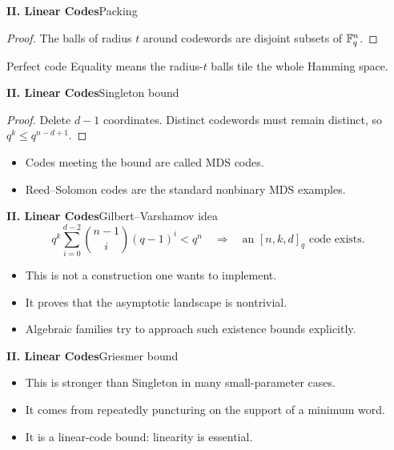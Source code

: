 \begin{frame}{\textbf{II. Linear Codes}}{Packing}
\small
{}
\begin{proof}
The balls of radius $t$ around codewords are disjoint subsets of $\mathbb{F}_q^n$.
\end{proof}
\begin{block}{Perfect code}
Equality means the radius-$t$ balls tile the whole Hamming space.
\end{block}
\end{frame}

\begin{frame}{\textbf{II. Linear Codes}}{Singleton bound}
\small
{}
\begin{proof}
Delete $d-1$ coordinates. Distinct codewords must remain distinct, so $q^k\le q^{n-d+1}$.
\end{proof}
\begin{itemize}
  \item Codes meeting the bound are called MDS codes.
  \item Reed--Solomon codes are the standard nonbinary MDS examples.
\end{itemize}
\end{frame}

\begin{frame}{\textbf{II. Linear Codes}}{Gilbert--Varshamov idea}
\small
{}
\[
  q^k\sum_{i=0}^{d-2}\binom{n-1}{i}(q-1)^i < q^n
  \quad\Rightarrow\quad
  \text{an }[n,k,d]_q\text{ code exists.}
\]
\begin{itemize}
  \item This is not a construction one wants to implement.
  \item It proves that the asymptotic landscape is nontrivial.
  \item Algebraic families try to approach such existence bounds explicitly.
\end{itemize}
\end{frame}

\begin{frame}{\textbf{II. Linear Codes}}{Griesmer bound}
\small
{}
\begin{itemize}
  \item This is stronger than Singleton in many small-parameter cases.
  \item It comes from repeatedly puncturing on the support of a minimum word.
  \item It is a linear-code bound: linearity is essential.
\end{itemize}
\end{frame}

